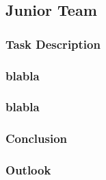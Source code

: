 \subsection{Junior Team}
\subsubsection{Task Description}
\subsubsection{blabla}
\subsubsection{blabla}
\subsubsection{Conclusion}
\subsubsection{Outlook}
